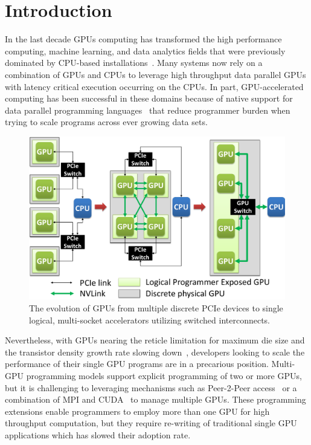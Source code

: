 \vspace{-.05in}
\section{Introduction}
\label{introduction}

In the last decade GPUs computing has transformed the high performance 
computing, machine learning, and data analytics fields that were previously 
dominated by CPU-based 
installations~\cite{intersect360,cudnn,Lavin15b,SimonyanZ14a}. Many systems now 
rely on a combination of GPUs and CPUs to leverage high throughput data parallel 
GPUs with latency critical execution occurring on the CPUs. In part, 
GPU-accelerated computing has been successful in these domains because of native 
support for data parallel programming languages~\cite{CUDA7,OPENCL} that reduce 
programmer burden when trying to scale programs across ever growing data sets.

\begin{figure}[t]
\centering
\includegraphics[width=1.0\columnwidth]{figures/inter_gpu_connections.pdf}
\caption{The evolution of GPUs from multiple discrete PCIe devices to 
single logical, multi-socket accelerators utilizing switched interconnects.}
\label{fig:systemdiagram}
\vspace{-.2in}
\end{figure}

Nevertheless, with GPUs nearing the reticle limitation for maximum die size and 
the transistor density growth rate slowing down~\cite{mooredead2016}, developers 
looking to scale the performance of their single GPU programs are in a 
precarious position. Multi-GPU programming models support explicit programming 
of two or more GPUs, but it is challenging to leveraging mechanisms such as 
Peer-2-Peer access~\cite{NVIDIAP2P} or a combination of MPI and 
CUDA~\cite{NVIDIAMPI} to manage multiple GPUs. These programming extensions 
enable programmers to employ more than one GPU for high throughput computation, 
but they require re-writing of traditional single GPU applications which has 
slowed their adoption rate.

